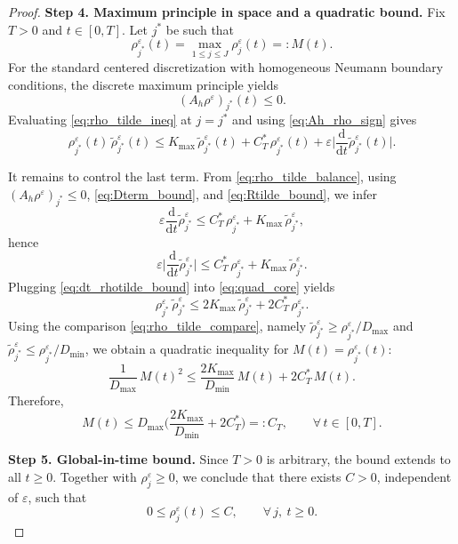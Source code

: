 \documentclass[11pt, dina4, amsfont12]{article}
\begin{document}
\begin{proof}
\medskip
\noindent
\textbf{Step 4. Maximum principle in space and a quadratic bound.}
Fix $T>0$ and $t\in[0,T]$. Let $j^\ast$ be such that
\[
\rho_{j^\ast}^\varepsilon(t)=\max_{1\le j\le J}\rho_j^\varepsilon(t)=:M(t).
\]
For the standard centered discretization with homogeneous Neumann boundary conditions,
the discrete maximum principle yields
\begin{equation}\label{eq:Ah_rho_sign}
(A_h\rho^\varepsilon)_{j^\ast}(t)\le 0.
\end{equation}
Evaluating \eqref{eq:rho_tilde_ineq} at $j=j^\ast$ and using \eqref{eq:Ah_rho_sign}
gives
\begin{equation}\label{eq:quad_core}
\rho_{j^\ast}^\varepsilon(t)\,\widetilde\rho_{j^\ast}^\varepsilon(t)
\le
K_{\max}\,\widetilde\rho_{j^\ast}^\varepsilon(t)
+ C_T^\ast\,\rho_{j^\ast}^\varepsilon(t)
+ \varepsilon \Big|\frac{\mathrm d}{\mathrm dt}\widetilde\rho_{j^\ast}^\varepsilon(t)\Big|.
\end{equation}

It remains to control the last term. From \eqref{eq:rho_tilde_balance}, using
$(A_h\rho^\varepsilon)_{j^\ast}\le 0$, \eqref{eq:Dterm_bound}, and \eqref{eq:Rtilde_bound},
we infer
\[
\varepsilon \frac{\mathrm d}{\mathrm dt}\widetilde\rho_{j^\ast}^\varepsilon
\le
C_T^\ast\,\rho_{j^\ast}^\varepsilon
+ K_{\max}\,\widetilde\rho_{j^\ast}^\varepsilon,
\]
hence
\begin{equation}\label{eq:dt_rhotilde_bound}
\varepsilon \Big|\frac{\mathrm d}{\mathrm dt}\widetilde\rho_{j^\ast}^\varepsilon\Big|
\le
C_T^\ast\,\rho_{j^\ast}^\varepsilon
+ K_{\max}\,\widetilde\rho_{j^\ast}^\varepsilon.
\end{equation}
Plugging \eqref{eq:dt_rhotilde_bound} into \eqref{eq:quad_core} yields
\[
\rho_{j^\ast}^\varepsilon\,\widetilde\rho_{j^\ast}^\varepsilon
\le
2K_{\max}\,\widetilde\rho_{j^\ast}^\varepsilon
+ 2C_T^\ast\,\rho_{j^\ast}^\varepsilon.
\]
Using the comparison \eqref{eq:rho_tilde_compare}, namely
$\widetilde\rho_{j^\ast}^\varepsilon\ge \rho_{j^\ast}^\varepsilon/D_{\max}$ and
$\widetilde\rho_{j^\ast}^\varepsilon\le \rho_{j^\ast}^\varepsilon/D_{\min}$,
we obtain a quadratic inequality for $M(t)=\rho_{j^\ast}^\varepsilon(t)$:
\[
\frac{1}{D_{\max}}\,M(t)^2
\le
\frac{2K_{\max}}{D_{\min}}\,M(t)
+2C_T^\ast\,M(t).
\]
Therefore,
\[
M(t)\le
D_{\max}\Big(\frac{2K_{\max}}{D_{\min}}+2C_T^\ast\Big)
=:C_T,
\qquad \forall\, t\in[0,T].
\]

\medskip
\noindent
\textbf{Step 5. Global-in-time bound.}
Since $T>0$ is arbitrary, the bound extends to all $t\ge0$. Together with
$\rho_j^\varepsilon\ge0$, we conclude that there exists $C>0$, independent of
$\varepsilon$, such that
\[
0\le \rho_j^\varepsilon(t)\le C,
\qquad \forall\, j,\ t\ge0.
\]
\end{proof}
\end{document}
